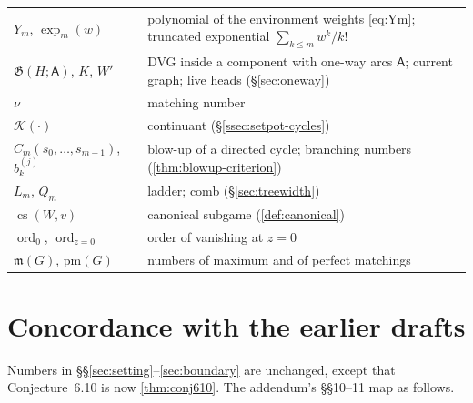 \documentclass[11pt]{amsart}
\theoremstyle{plain}
\theoremstyle{definition}
\theoremstyle{remark}
\numberwithin{equation}{section}
\newcommand{\cont}{\mathcal{K}}           %
\newcommand{\game}{\mathfrak{G}}          %
\newcommand{\arcs}{\mathsf{A}}            %
\newcommand{\mm}{\mathfrak{m}}            %
\newcommand{\ord}{\operatorname{ord}}
\begin{document}
\begin{center}
\begin{longtable}{@{}L{0.25}L{0.71}@{}}
$Y_m$, $\exp_m(w)$ & polynomial of the environment weights \eqref{eq:Ym}; truncated exponential $\sum_{k\le m}w^k/k!$\\
$\game(H;\arcs)$, $K$, $W'$ & DVG inside a component with one-way arcs $\arcs$; current graph; live heads (\S\ref{sec:oneway})\\
$\nu$ & matching number\\
$\cont(\cdot)$ & continuant (\S\ref{ssec:setpot-cycles})\\
$C_m(s_0,\dots,s_{m-1})$, $b^{(j)}_k$ & blow-up of a directed cycle; branching numbers (\cref{thm:blowup-criterion})\\
$L_m$, $Q_m$ & ladder; comb (\S\ref{sec:treewidth})\\
$\operatorname{cs}(W,v)$ & canonical subgame (\cref{def:canonical})\\
$\ord_0$, $\ord_{z=0}$ & order of vanishing at $z=0$\\
$\mm(G)$, $\mathrm{pm}(G)$ & numbers of maximum and of perfect matchings\\
\bottomrule
\end{longtable}
\end{center}

\section{Concordance with the earlier drafts}\label{app:concordance}

Numbers in \S\S\ref{sec:setting}--\ref{sec:boundary} are unchanged, except that Conjecture~6.10 is now \cref{thm:conj610}. The addendum's \S\S10--11 map as follows.
\end{document}
